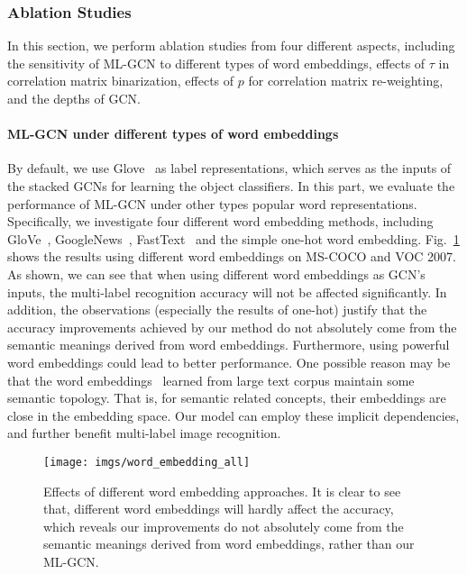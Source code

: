 \documentclass[10pt,twocolumn,letterpaper]{article}
\begin{document}
\subsubsection{Ablation Studies}

In this section, we perform ablation studies from four different aspects, including the sensitivity of ML-GCN to different types of word embeddings, effects of $\tau$ in correlation matrix binarization, effects of $p$ for correlation matrix re-weighting, and the depths of GCN. 


\paragraph{ML-GCN under different types of word embeddings}

By default, we use Glove~\cite{glove} as label representations, which serves as the inputs of the stacked GCNs for learning the object classifiers. In this part, we evaluate the performance of ML-GCN under other types popular word representations. Specifically, we investigate four different word embedding methods, including GloVe~\cite{glove}, GoogleNews~\cite{googlenews}, FastText~\cite{fasttext} and the simple one-hot word embedding. Fig.~\ref{fig:word} shows the results using different word embeddings on MS-COCO and VOC 2007. As shown, we can see that when using different word embeddings as GCN's inputs, the multi-label recognition accuracy will not be affected significantly. In addition, the observations (especially the results of one-hot) justify that the accuracy improvements achieved by our method do not absolutely come from the semantic meanings derived from word embeddings. Furthermore, using powerful word embeddings could lead to better performance. One possible reason may be that the word embeddings~\cite{glove,googlenews,fasttext} learned from large text corpus maintain some semantic topology. That is, for semantic related concepts, their embeddings are close in the embedding space. Our model can employ these implicit dependencies, and further benefit multi-label image recognition. 



\begin{figure}[t]
	\centering
	\texttt{[image: imgs/word\_embedding\_all]}
	\caption{Effects of different word embedding approaches. It is clear to see that, different word embeddings will hardly affect the accuracy, which reveals our improvements do not absolutely come from the semantic meanings derived from word embeddings, rather than our ML-GCN.}
	\label{fig:word}
\end{figure}
\end{document}
